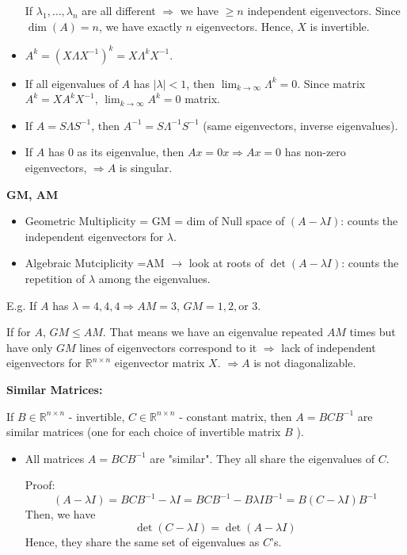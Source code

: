 \documentclass[14pt]{article}
\theoremstyle{definition}
\theoremstyle{remark}
\begin{document}
\begin{multicols}{2}
\begin{itemize}
              If $\lambda_1, \ldots, \lambda_n$ are all different $\Longrightarrow$ we have $\ge n$ independent eigenvectors. Since $\dim(A)=n$, we have exactly $n$ eigenvectors. Hence, $X$ is invertible.
        \item $A^k =  (X\Lambda X^{-1})^k = X\Lambda^k X^{-1}$.
        \item If all eigenvalues of $A$ has $|\lambda|<1$, then $\lim _{k \rightarrow \infty} \Lambda^k=0$. Since matrix $A^k=X A^k X^{-1}$, $\lim_{k \rightarrow \infty} A^k = 0$ matrix.
        \item If $A=S \Lambda S^{-1}$, then $A^{-1}=S \Lambda^{-1} S^{-1}$ (same eigenvectors, inverse eigenvalues).
        \item If $A$ has $0$ as its eigenvalue, then $Ax = 0x \Longrightarrow  Ax = 0$ has non-zero eigenvectors, $\Longrightarrow A$ is singular.
    \end{itemize}
    \textbf{GM, AM}
    \begin{itemize}
        \item Geometric Multiplicity = GM = dim of Null space of $(A-\lambda I)$: counts the independent eigenvectors for $\lambda$.
        \item Algebraic Mutciplicity =AM $\rightarrow$ look at roots of $\det(A-\lambda I)$: counts the repetition of $\lambda$ among the eigenvalues.
    \end{itemize}
    E.g. If $A$ has $\lambda=4,4,4 \Rightarrow AM=3$, $GM=1,2, \text {or } 3$.

    If for $A$, $GM \le AM$. That means we have an eigenvalue repeated $AM$ times but have only $GM$ lines of eigenvectors correspond to it $\Rightarrow$ lack of independent eigenvectors for $\mathbb{R}^{n\times n}$ eigenvector matrix $X$. $\Rightarrow A$ is not diagonalizable.


    \textbf{Similar Matrices:}

    If $B \in \mathbb{R}^{n \times n}$ - invertible, $C \in \mathbb{R}^{n \times n}$ - constant matrix, then $A=B C B^{-1}$ are similar matrices (one for each choice of invertible matrix $B$ ).
    \begin{itemize}
        \item All matrices $A=B C B^{-1}$ are "similar". They all share the eigenvalues of $C$.

              Proof: \[
                  (A-\lambda I)=B C B^{-1}-\lambda I=BCB^{-1}-B \lambda I B^{-1}=B(C-\lambda I) B^{-1}
              \]
              Then, we have
              \[\operatorname{\det}(C-\lambda I) = \operatorname{\det}(A-\lambda I)
              \]
              Hence, they share the same set of eigenvalues as $C$'s.
    \end{itemize}

\end{multicols}
\end{document}
